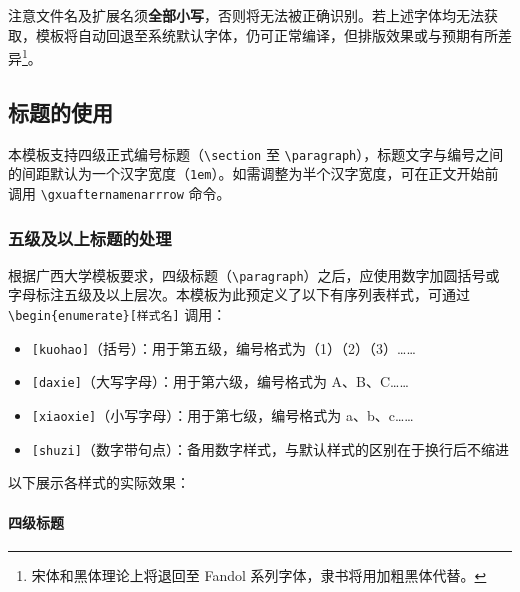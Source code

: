 注意文件名及扩展名须\textbf{全部小写}，否则将无法被正确识别。若上述字体均无法获取，模板将自动回退至系统默认字体，仍可正常编译，但排版效果或与预期有所差异\footnote{宋体和黑体理论上将退回至 Fandol 系列字体，隶书将用加粗黑体代替。}。

\subsection{标题的使用}

本模板支持四级正式编号标题（\verb|\section| 至 \verb|\paragraph|），标题文字与编号之间的间距默认为一个汉字宽度（\verb|1em|）。如需调整为半个汉字宽度，可在正文开始前调用 \verb|\gxuafternamenarrrow| 命令。

\subsubsection{五级及以上标题的处理}

根据广西大学模板要求，四级标题（\verb|\paragraph|）之后，应使用数字加圆括号或字母标注五级及以上层次。本模板为此预定义了以下有序列表样式，可通过 \verb|\begin{enumerate}[样式名]| 调用：

\begin{itemize}
    \item \verb|[kuohao]|（括号）：用于第五级，编号格式为（1）（2）（3）……
    \item \verb|[daxie]|（大写字母）：用于第六级，编号格式为 A、B、C……
    \item \verb|[xiaoxie]|（小写字母）：用于第七级，编号格式为 a、b、c……
    \item \verb|[shuzi]|（数字带句点）：备用数字样式，与默认样式的区别在于换行后不缩进
\end{itemize}

以下展示各样式的实际效果：

\paragraph{四级标题}

